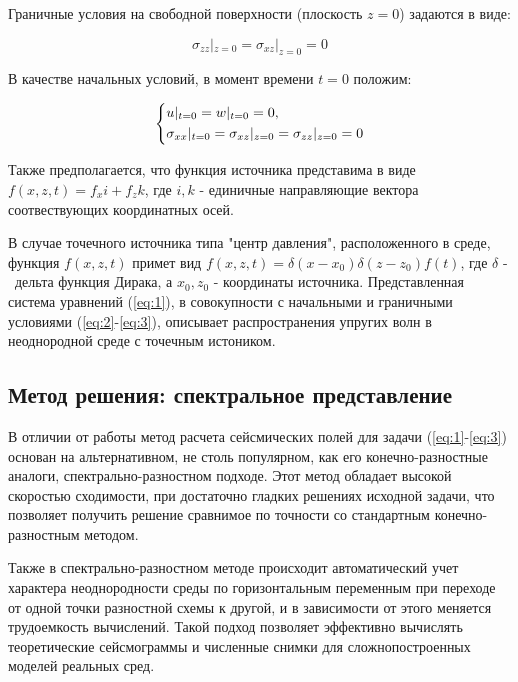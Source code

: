 Граничные условия на свободной поверхности (плоскость $z = 0$) задаются в виде:

\begin{equation}
	\label{eq:2}
	\sigma_{zz}|_{z=0}=\sigma_{xz}|_{z=0}=0
\end{equation}

В качестве начальных условий, в момент времени $t=0$ положим:

\begin{equation}
\begin{dcases}
	\label{eq:3}
	u |_{t=0}= w|_{t=0} = 0, \\
	\sigma_{xx}|_{t=0}=\sigma_{xz}|_{z=0}=\sigma_{zz}|_{z=0}=0
\end{dcases}
\end{equation}

Также предполагается, что функция источника представима в виде $f(x,z,t)=f_xi+f_zk$,
где $i, k$ - единичные направляющие вектора соотвествующих координатных осей.

В случае точечного источника типа "центр давления", расположенного в среде, функция $f(x,z,t)$ примет вид $f(x,z,t)=\delta(x-x_0)\delta(z-z_0)f(t)$,
где $\delta$ -  дельта функция Дирака, а $x_0, z_0$ - координаты источника.
Представленная система уравнений (\ref{eq:1}), в совокупности с начальными и граничными условиями (\ref{eq:2}-\ref{eq:3}),
описывает распространения упругих волн в неоднородной среде с точечным истоником.
\subsection{Метод решения: спектральное представление}
В отличии от работы \cite{karavaev} метод расчета сейсмических полей для задачи (\ref{eq:1}-\ref{eq:3}) основан на альтернативном,
не столь популярном, как его конечно-разностные аналоги, спектрально-разностном подходе. Этот метод обладает высокой скоростью сходимости,
при достаточно гладких решениях исходной задачи, что позволяет получить решение сравнимое по точности со стандартным
конечно-разностным методом.

Также в спектрально-разностном методе происходит автоматический учет характера неоднородности среды по горизонтальным переменным при переходе от одной точки разностной схемы к другой, и в зависимости от этого меняется трудоемкость вычислений. Такой подход позволяет эффективно вычислять теоретические сейсмограммы и численные снимки для сложнопостроенных моделей реальных сред.

